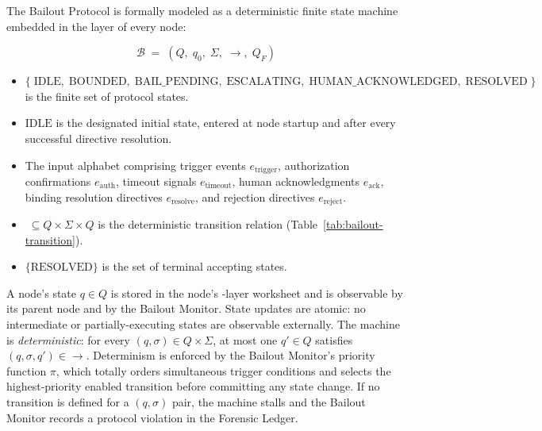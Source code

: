The Bailout Protocol is formally modeled as a deterministic finite state machine embedded in the \fact{} layer of every \bxthree{} node:

\[
\mathcal{B} \;=\; (Q,\; q_0,\; \Sigma,\; \rightarrow,\; Q_F)
\]

\begin{itemize}\itemsep=0pt
\item[$Q$] $\{\; \text{IDLE},\; \text{BOUNDED},\; \text{BAIL\_PENDING},\; \text{ESCALATING},\; \text{HUMAN\_ACKNOWLEDGED},\; \text{RESOLVED}\; \}$ is the finite set of protocol states.
\item[$q_0$] $\text{IDLE}$ is the designated initial state, entered at node startup and after every successful directive resolution.
\item[$\Sigma$] The input alphabet comprising trigger events $e_{\text{trigger}}$, authorization confirmations $e_{\text{auth}}$, timeout signals $e_{\text{timeout}}$, human acknowledgments $e_{\text{ack}}$, binding resolution directives $e_{\text{resolve}}$, and rejection directives $e_{\text{reject}}$.
\item[$\rightarrow$] $\; \subseteq Q \times \Sigma \times Q$ is the deterministic transition relation (Table~\ref{tab:bailout-transition}).
\item[$Q_F$] $\{\text{RESOLVED}\}$ is the set of terminal accepting states.
\end{itemize}

A node's state $q \in Q$ is stored in the node's \fact-layer worksheet and is observable by its parent node and by the Bailout Monitor. State updates are atomic: no intermediate or partially-executing states are observable externally. The machine is \emph{deterministic}: for every $(q, \sigma) \in Q \times \Sigma$, at most one $q' \in Q$ satisfies $(q, \sigma, q') \in \rightarrow$. Determinism is enforced by the Bailout Monitor's priority function $\pi$, which totally orders simultaneous trigger conditions and selects the highest-priority enabled transition before committing any state change. If no transition is defined for a $(q, \sigma)$ pair, the machine stalls and the Bailout Monitor records a protocol violation in the Forensic Ledger.

